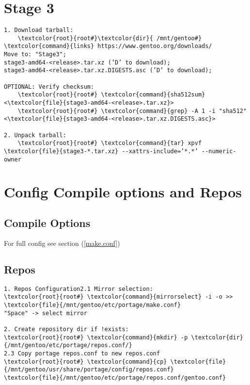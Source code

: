 \documentclass[10pt, a4paper, onecolumn, openany]{book}         %
\begin{document}
\section{Stage 3}
\begin{Verbatim}[commandchars=\\\{\}]
1. Download tarball:
    \textcolor{root}{root#}\textcolor{dir}{ /mnt/gentoo#} \textcolor{command}{links} https://www.gentoo.org/downloads/
Move to: "Stage3";
stage3-amd64-<release>.tar.xz (’D’ to download);
stage3-amd64-<release>.tar.xz.DIGESTS.asc (’D’ to download);

OPTIONAL: Verify checksum:
    \textcolor{root}{root#} \textcolor{command}{sha512sum} <\textcolor{file}{stage3-amd64-<release>.tar.xz}>
    \textcolor{root}{root#} \textcolor{command}{grep} -A 1 -i "sha512" <\textcolor{file}{stage3-amd64-<release>.tar.xz.DIGESTS.asc}>

2. Unpack tarball:
    \textcolor{root}{root#} \textcolor{command}{tar} xpvf \textcolor{file}{stage3-*.tar.xz} --xattrs-include=’*.*’ --numeric-owner
\end{Verbatim}

\section{Config Compile options and Repos}
\subsection{Compile Options}
For full config see section (\underline{\ref{make.conf}})


\subsection{Repos}
\begin{Verbatim}[commandchars=\\\{\}]
1. Repos Configuration2.1 Mirror selection:
\textcolor{root}{root#} \textcolor{command}{mirrorselect} -i -o >> \textcolor{file}{/mnt/gentoo/etc/portage/make.conf}
"Space" -> select mirror

2. Create repository dir if !exists:
\textcolor{root}{root#} \textcolor{command}{mkdir} -p \textcolor{dir}{/mnt/gentoo/etc/portage/repos.conf/}
2.3 Copy portage repos.conf to new repos.conf
\textcolor{root}{root#} \textcolor{command}{cp} \textcolor{file}{/mnt/gentoo/usr/share/portage/config/repos.conf} 
\textcolor{file}{/mnt/gentoo/etc/portage/repos.conf/gentoo.conf}
\end{Verbatim}
\end{document}
